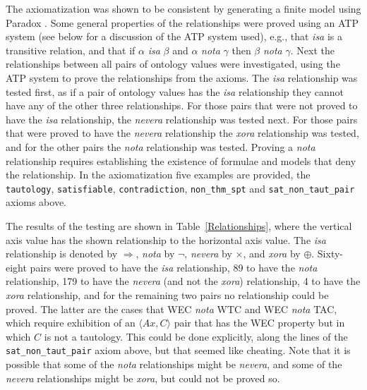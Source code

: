 \documentclass[a4paper]{easychair}
\newcommand{\isa}{$\Rightarrow$}
\newcommand{\nta}{$\neg$}
\newcommand{\nra}{$\times$}
\newcommand{\xor}{$\oplus$}
\begin{document}
The axiomatization was shown to be consistent by generating a finite
model using Paradox \cite{CS03}.
Some general properties of the relationships were proved using an ATP system
(see below for a discussion of the ATP system used), e.g., that {\em isa}
is a transitive relation, and that if $\alpha$ {\em isa} $\beta$ and
$\alpha$ {\em nota} $\gamma$ then $\beta$ {\em nota} $\gamma$.
Next the relationships between all pairs of ontology values were investigated,
using the ATP system to prove the relationships from the axioms.
The {\em isa} relationship was tested first, as if a pair of ontology
values has the {\em isa} relationship they cannot have any of the other three
relationships.
For those pairs that were not proved to have the {\em isa} relationship,
the {\em nevera} relationship was tested next.
For those pairs that were proved to have the {\em nevera} relationship the
{\em xora} relationship was tested, and for the other pairs the {\em nota}
relationship was tested.
Proving a {\em nota} relationship requires establishing the existence of 
formulae and models that deny the relationship.
In the axiomatization five examples are provided, the {\tt tautology},
{\tt satisfiable}, {\tt contradiction}, {\tt non\_thm\_spt} and 
{\tt sat\_non\_taut\_pair} axioms above.

The results of the testing are shown in Table~\ref{Relationships}, where
the vertical axis value has the shown relationship to the horizontal axis
value.
The {\em isa} relationship is denoted by \isa, {\em nota} by \nta,
{\em nevera} by \nra, and {\em xora} by \xor.
Sixty-eight pairs were proved to have the {\em isa} relationship,
89 to have the {\em nota} relationship,
179 to have the {\em nevera} (and not the {\em xora}) relationship,
4 to have the {\em xora} relationship, and
for the remaining two pairs no relationship could be proved.
The latter are the cases that WEC {\em nota} WTC and WEC {\em nota} TAC, 
which require exhibition of an $\langle Ax, C \rangle$ pair that has the 
WEC property but in which $C$ is not a tautology.
This could be done explicitly, along the lines of the 
{\tt sat\_non\_taut\_pair} axiom above, but that seemed like cheating.
Note that it is possible that some of the {\em nota} relationships might 
be {\em nevera}, and some of the {\em nevera} relationships might be 
{\em xora}, but could not be proved so.
\end{document}

